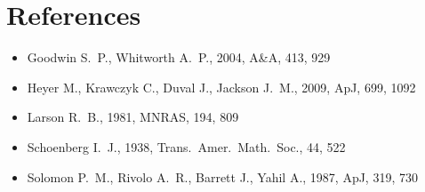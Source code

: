 \documentclass[11pt,a4paper]{article}
\begin{document}
\section*{References}
\begin{itemize}\setlength\itemsep{0pt}
\item Goodwin S.~P., Whitworth A.~P., 2004, A\&A, 413, 929
\item Heyer M., Krawczyk C., Duval J., Jackson J.~M., 2009, ApJ, 699,
  1092
\item Larson R.~B., 1981, MNRAS, 194, 809
\item Schoenberg I.~J., 1938, Trans.\ Amer.\ Math.\ Soc., 44, 522
\item Solomon P.~M., Rivolo A.~R., Barrett J., Yahil A., 1987, ApJ, 319,
  730
\end{itemize}
\end{document}
